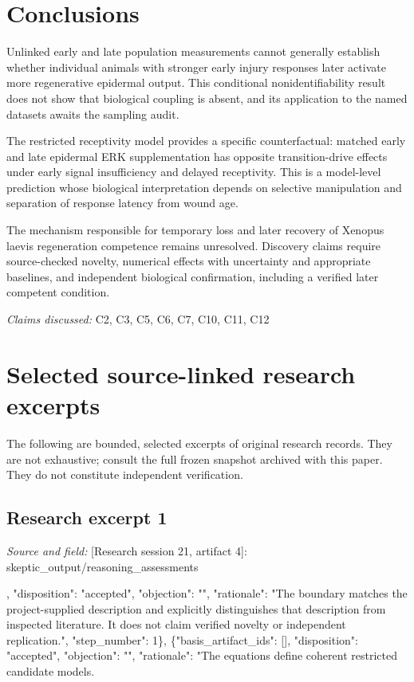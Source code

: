 \documentclass[11pt]{article}
\begin{document}
\section{Conclusions}
Unlinked early and late population measurements cannot generally establish whether individual animals with stronger early injury responses later activate more regenerative epidermal output. This conditional nonidentifiability result does not show that biological coupling is absent, and its application to the named datasets awaits the sampling audit.

The restricted receptivity model provides a specific counterfactual: matched early and late epidermal ERK supplementation has opposite transition-drive effects under early signal insufficiency and delayed receptivity. This is a model-level prediction whose biological interpretation depends on selective manipulation and separation of response latency from wound age.

The mechanism responsible for temporary loss and later recovery of Xenopus laevis regeneration competence remains unresolved. Discovery claims require source-checked novelty, numerical effects with uncertainty and appropriate baselines, and independent biological confirmation, including a verified later competent condition.

\textit{Claims discussed: }C2, C3, C5, C6, C7, C10, C11, C12
\appendix
\section{Selected source-linked research excerpts}
The following are bounded, selected excerpts of original research records. They are not exhaustive; consult the full frozen snapshot archived with this paper. They do not constitute independent verification.
\subsection{Research excerpt 1}
\textit{Source and field: }[Research session 21, artifact 4]: skeptic\_output/reasoning\_assessments\par
[\{"basis\_artifact\_ids": [], "disposition": "accepted", "objection": "", "rationale": "The boundary matches the project-supplied description and explicitly distinguishes that description from inspected literature. It does not claim verified novelty or independent replication.", "step\_number": 1\}, \{"basis\_artifact\_ids": [], "disposition": "accepted", "objection": "", "rationale": "The equations define coherent restricted candidate models.
\end{document}
